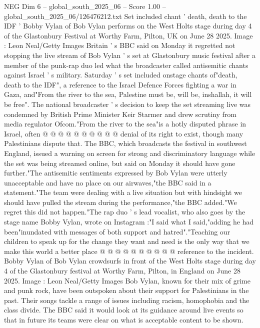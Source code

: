 \begin{textsample}{NEG Dim 6 – global\_south\_2025\_06 – Score 1.00 – global\_south\_2025\_06/126476212.txt}  \label{ex:f6_neg_428}
Set included chant ' death, death to the IDF ' Bobby Vylan of Bob Vylan performs on the West Holts stage during day 4 of the Glastonbury Festival at Worthy Farm, Pilton, UK on June 28 2025.
Image : Leon Neal/Getty Images Britain ' s BBC said on Monday it regretted not stopping the live stream of Bob Vylan ' s set at Glastonbury music festival after a member of the punk-rap duo led what the broadcaster called antisemitic chants against Israel ' s military.
Saturday ' s set included onstage chants of"death, death to the IDF", a reference to the Israel Defence Forces fighting a war in Gaza, and"From the river to the sea, Palestine must be, will be, inshallah, it will be free".
The national broadcaster ' s decision to keep the set streaming live was condemned by British Prime Minister Keir Starmer and drew scrutiny from media regulator Ofcom."From the river to the sea"is a hotly disputed phrase in Israel, often @ @ @ @ @ @ @ @ @ @ denial of its right to exist, though many Palestinians dispute that.
The BBC, which broadcasts the festival in southwest England, issued a warning on screen for strong and discriminatory language while the set was being streamed online, but said on Monday it should have gone further."The antisemitic sentiments expressed by Bob Vylan were utterly unacceptable and have no place on our airwaves,"the BBC said in a statement."The team were dealing with a live situation but with hindsight we should have pulled the stream during the performance,"the BBC added."We regret this did not happen."The rap duo ' s lead vocalist, who also goes by the stage name Bobby Vylan, wrote on Instagram :"I said what I said,"adding he had been"inundated with messages of both support and hatred"."Teaching our children to speak up for the change they want and need is the only way that we make this world a better place @ @ @ @ @ @ @ @ @ @ reference to the incident.
Bobby Vylan of Bob Vylan crowdsurfs in front of the West Holts stage during day 4 of the Glastonbury festival at Worthy Farm, Pilton, in England on June 28 2025.
Image : Leon Neal/Getty Images Bob Vylan, known for their mix of grime and punk rock, have been outspoken about their support for Palestinians in the past.
Their songs tackle a range of issues including racism, homophobia and the class divide.
The BBC said it would look at its guidance around live events so that in future its teams were clear on what is acceptable content to be shown.

\end{textsample}
